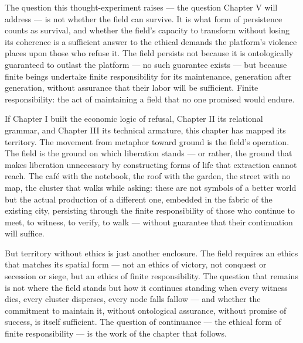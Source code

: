 The question this thought-experiment raises — the question Chapter V will address — is not whether the field can survive. It is what form of persistence counts as survival, and whether the field's capacity to transform without losing its coherence is a sufficient answer to the ethical demands the platform's violence places upon those who refuse it. The field persists not because it is ontologically guaranteed to outlast the platform — no such guarantee exists — but because finite beings undertake finite responsibility for its maintenance, generation after generation, without assurance that their labor will be sufficient. Finite responsibility: the act of maintaining a field that no one promised would endure.

If Chapter I built the economic logic of refusal, Chapter II its relational grammar, and Chapter III its technical armature, this chapter has mapped its territory. The movement from metaphor toward ground is the field's operation. The field is the ground on which liberation stands — or rather, the ground that makes liberation unnecessary by constructing forms of life that extraction cannot reach. The café with the notebook, the roof with the garden, the street with no map, the cluster that walks while asking: these are not symbols of a better world but the actual production of a different one, embedded in the fabric of the existing city, persisting through the finite responsibility of those who continue to meet, to witness, to verify, to walk — without guarantee that their continuation will suffice.

But territory without ethics is just another enclosure. The field requires an ethics that matches its spatial form — not an ethics of victory, not conquest or secession or siege, but an ethics of finite responsibility. The question that remains is not where the field stands but how it continues standing when every witness dies, every cluster disperses, every node falls fallow — and whether the commitment to maintain it, without ontological assurance, without promise of success, is itself sufficient. The question of continuance — the ethical form of finite responsibility — is the work of the chapter that follows.